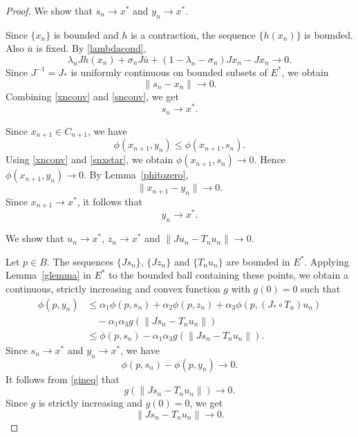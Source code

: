 \documentclass[10pt,a4paper]{amsart}
\begin{document}
\begin{proof}
 We show that $s_n\to x^{*}$ and $y_n\to x^{*}$.

Since $\{x_n\}$ is bounded and $h$ is a contraction, the sequence $\{h(x_n)\}$ is bounded. Also $\bar u$ is fixed. By \eqref{lambdacond},
\[
\lambda_nJh(x_n)+\sigma_nJ\bar u+(1-\lambda_n-\sigma_n)Jx_n-Jx_n\to 0.
\]
Since $J^{-1}=J_{*}$ is uniformly continuous on bounded subsets of $E^{*}$, we obtain
\begin{equation}\label{snconv}
\|s_n-x_n\|\to 0.
\end{equation}
Combining \eqref{xnconv} and \eqref{snconv}, we get
\begin{equation}\label{snxstar}
s_n\to x^{*}.
\end{equation}

Since $x_{n+1}\in C_{n+1}$, we have
\[
\phi(x_{n+1},y_n)\leq \phi(x_{n+1},s_n).
\]
Using \eqref{xnconv} and \eqref{snxstar}, we obtain $\phi(x_{n+1},s_n)\to 0$. Hence $\phi(x_{n+1},y_n)\to 0$. By Lemma~\ref{phitozero},
\[
\|x_{n+1}-y_n\|\to 0.
\]
Since $x_{n+1}\to x^{*}$, it follows that
\begin{equation}\label{ynconv}
y_n\to x^{*}.
\end{equation}

 We show that $u_n\to x^{*}$, $z_n\to x^{*}$ and $\|Ju_n-T_nu_n\|\to 0$.

Let $p\in B$. The sequences $\{Js_n\}$, $\{Jz_n\}$ and $\{T_nu_n\}$ are bounded in $E^{*}$. Applying Lemma~\ref{glemma} in $E^{*}$ to the bounded ball containing these points, we obtain a continuous, strictly increasing and convex function $g$ with $g(0)=0$ such that
\begin{align}\label{gineq}
\phi(p,y_n)
&\leq \alpha_1\phi(p,s_n)+\alpha_2\phi(p,z_n)+\alpha_3\phi(p,(J_{*}\circ T_n)u_n)\nonumber\\
&\quad -\alpha_1\alpha_3g(\|Js_n-T_nu_n\|)\nonumber\\
&\leq \phi(p,s_n)-\alpha_1\alpha_3g(\|Js_n-T_nu_n\|).
\end{align}
Since $s_n\to x^{*}$ and $y_n\to x^{*}$, we have
\[
\phi(p,s_n)-\phi(p,y_n)\to 0.
\]
It follows from \eqref{gineq} that
\[
g(\|Js_n-T_nu_n\|)\to 0.
\]
Since $g$ is strictly increasing and $g(0)=0$, we get
\begin{equation}\label{residual1}
\|Js_n-T_nu_n\|\to 0.
\end{equation}


\end{proof}
\end{document}
